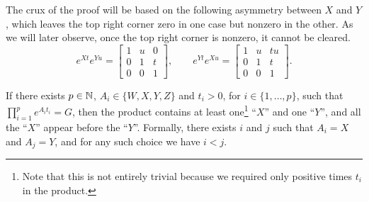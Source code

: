 The crux of the proof will be based on the following asymmetry between $X$ and $Y$,
which leaves the top right corner zero in one case but nonzero in the other. As we will later
observe, once the top right corner is nonzero, it cannot be cleared.
\[
e^{Xt}e^{Yu}=\begin{bmatrix}1&u&0\\0&1&t\\0&0&1\end{bmatrix},\qquad
e^{Yt}e^{Xu}=\begin{bmatrix}1&u&tu\\0&1&t\\0&0&1\end{bmatrix}.
\]

\begin{proposition}\label{prop:eq_has_forced_order}
If there exists $p\in\mathbb{N}$, $A_i\in\{W,X,Y,Z\}$ and $t_i>0$, for $i\in\{1,\ldots,p\}$,
such that $\prod_{i=1}^pe^{A_it_i}=G$, then the product contains at least one\footnote{Note
that this is not entirely trivial because we required only positive times $t_i$ in the product.}
``$X$'' and one ``$Y$'', and all the ``$X$'' appear before the ``$Y$''.
Formally, there exists $i$ and $j$ such that $A_i=X$ and $A_j=Y$, and for
any such choice we have $i<j$.
\end{proposition}

